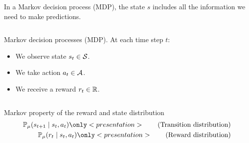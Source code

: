 \documentclass[9pt]{beamer}
\begin{document}
\begin{frame}
  In a Markov decision process (MDP), the state $s$ includes all the information we need to make predictions.
  \begin{columns}
    \begin{column}{0.49\textwidth}
      \begin{block}{Markov decision processes (MDP).}
        At each time
        step $t$:
        \begin{itemize}
        \item We observe \alert{state} $s_t \in {\mathcal{S}}$.
        \item We take \alert{action} $a_t \in {\mathcal{A}}$.
        \item We receive a \alert{reward} $r_t \in {\mathbb{R}}$.
        \end{itemize}
      \end{block}
    \end{column}
    \begin{column}{0.49\textwidth}
      \begin{center}
      \end{center}
    \end{column}
  \end{columns}
  \begin{block}{Markov property of the reward and state distribution}
    \begin{align}
      \Pr_\mdp(s_{t+1} \mid s_t, a_t)  \only<presentation>{\tag{Transition distribution}}
      \\
      \Pr_\mdp(r_{t} \mid s_t, a_t) \only<presentation>{\tag{Reward distribution}}
    \end{align}
  \end{block}
\end{frame}
\end{document}
